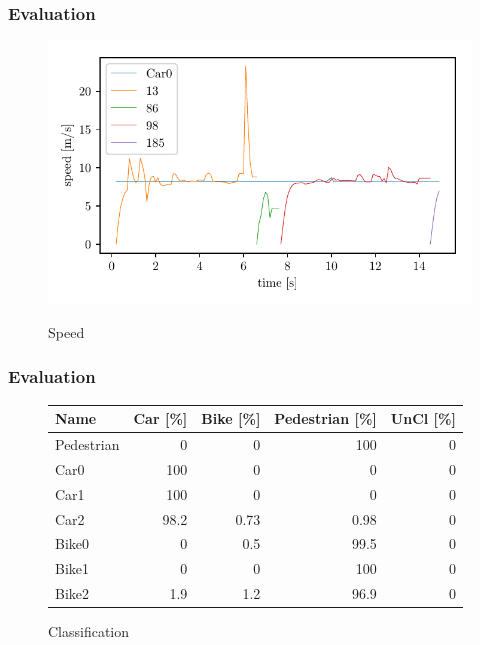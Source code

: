 \documentclass[nosymbols]{beamer}	%
\begin{document}
\begin{frame}
\frametitle{Evaluation}
\begin{figure}[!ht]
\begin{center}
\caption{Speed}
\includegraphics[width=\textwidth,height=0.7\textheight,keepaspectratio]{bilder/Car0_speed.pdf}
\label{obst_cases}
\end{center}
\end{figure}
\end{frame}

\begin{frame}
\frametitle{Evaluation}
\begin{figure}[!htb]
  \caption{Classification} 
  \centering
  \begin{tabularx}{\textwidth}{X|r|r|r|r}
  \hline \textbf{Name} & \textbf{Car [\%]} & \textbf{Bike [\%]} & \textbf{Pedestrian [\%]} & \textbf{UnCl [\%]} \\\hline
    Pedestrian & 0 & 0 & 100 & 0 \\\hline
    Car0 & 100 & 0 & 0 & 0 \\\hline
    Car1 & 100 & 0 & 0 & 0 \\\hline
    Car2 & 98.2 & 0.73 & 0.98 & 0 \\\hline
    Bike0 & 0 & 0.5 & 99.5 & 0 \\\hline
    Bike1 & 0 & 0 & 100 & 0 \\\hline
    Bike2 & 1.9 & 1.2 & 96.9 & 0 \\
  \end{tabularx}
 \label{classification}
\end{figure}
\end{frame}
\end{document}
